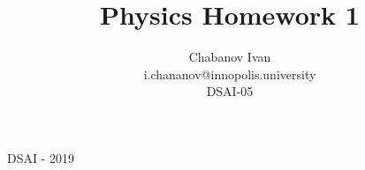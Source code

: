 

\begin{titlepage}
    \title{Physics Homework 1}
    \author{Chabanov Ivan\\i.chananov@innopolis.university\\DSAI-05}
    \maketitle
    DSAI - 2019


\end{titlepage}